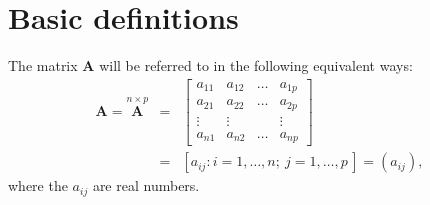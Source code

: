 \documentclass[]{book}
\theoremstyle{definition}
\theoremstyle{definition}
\theoremstyle{definition}
\theoremstyle{remark}
\begin{document}
\renewcommand{\bY}{\boldsymbol Y}
\renewcommand{\bx}{\boldsymbol x}
\renewcommand{\bX}{\boldsymbol X}
\renewcommand{\bH}{\boldsymbol H}
\renewcommand{\by}{\boldsymbol y}
\renewcommand{\bz}{\boldsymbol z}
\renewcommand{\bS}{\boldsymbol S}
\renewcommand{\bR}{\boldsymbol R}
\renewcommand{\bI}{\boldsymbol I}
\renewcommand{\bmu}{\boldsymbol \mu}
\renewcommand{\bSigma}{\boldsymbol \Sigma}
\renewcommand{\bLambda}{\boldsymbol \Lambda}
\renewcommand{\bgamma}{\boldsymbol \gamma}
\renewcommand{\blambda}{\boldsymbol \lambda}
\renewcommand{\bA}{\boldsymbol A}
\renewcommand{\bB}{\boldsymbol B}
\renewcommand{\bD}{\boldsymbol D}
\renewcommand{\bM}{\boldsymbol M}
\renewcommand{\bP}{\boldsymbol P}
\renewcommand{\bQ}{\boldsymbol Q}
\renewcommand{\bT}{\boldsymbol T}
\renewcommand{\bW}{\boldsymbol W}
\renewcommand{\ba}{\boldsymbol a}
\renewcommand{\bb}{\boldsymbol b}
\renewcommand{\bc}{\boldsymbol c}
\renewcommand{\bd}{\boldsymbol d}
\renewcommand{\bh}{\boldsymbol h}
\renewcommand{\bp}{\boldsymbol p}
\renewcommand{\bq}{\boldsymbol q}
\renewcommand{\bu}{\boldsymbol u}
\renewcommand{\bzero}{\boldsymbol 0}
\renewcommand{\mR}{\mathbb R}
\renewcommand{\cR}{\mathcal R}

\renewcommand{\bs}{\boldsymbol}
\renewcommand{\ds}{\displaystyle}
\renewcommand{\tdiag}{\text{diag}}
\renewcommand{\ttr}{\text{tr}}
\renewcommand{\tmin}{\text{min}}
\renewcommand{\tmax}{\text{max}}
\renewcommand{\tdet}{\text{det}}

\renewcommand{\tcov}{\text{cov}}
\renewcommand{\texp}{\text{exp}}
\renewcommand{\lb}{\left(}
\renewcommand{\rb}{\right)}
\renewcommand{\lsb}{\left[}
\renewcommand{\rsb}{\right]}

\hypertarget{basic-definitions}{%
\section{Basic definitions}\label{basic-definitions}}

The matrix \({\mathbf A}\) will be referred to in the following equivalent ways:
\begin{eqnarray*}
{\mathbf A}=\stackrel{n\times p}{\mathbf A} &=& \left[\begin{array}{cccc}
a_{11}&a_{12}&\dots&a_{1p}\\
a_{21}&a_{22}&\dots&a_{2p}\\
\vdots&\vdots&&\vdots\\
a_{n1}&a_{n2}&\dots&a_{np}
\end{array} \right] \\
&=& [a_{ij}: i=1,\dots ,n;\ j=1,\dots ,p\,]=(a_{ij}),
\end{eqnarray*}
where the \(a_{ij}\) are real numbers.
\end{document}

